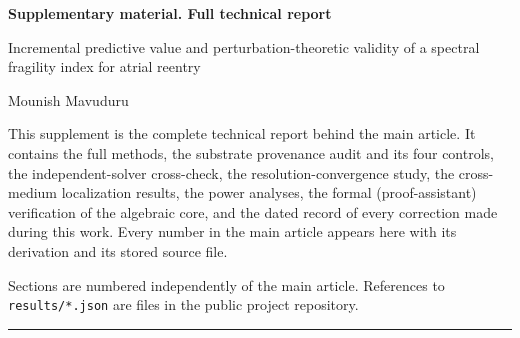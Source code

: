 \documentclass[11pt]{article}
\theoremstyle{definition}
\newcommand{\code}[1]{\texttt{#1}}
\begin{document}
\thispagestyle{empty}

\begin{center}
{\Large\bfseries Supplementary material. Full technical report\par}
\vspace{6pt}
{\large Incremental predictive value and perturbation-theoretic validity of a
spectral fragility index for atrial reentry\par}
\vspace{4pt}
Mounish Mavuduru
\end{center}

\vspace{1em}
\noindent This supplement is the complete technical report behind the main
article. It contains the full methods, the substrate provenance audit and
its four controls, the independent-solver cross-check, the resolution-convergence
study, the cross-medium localization results, the power analyses, the formal
(proof-assistant) verification of the algebraic core, and the dated record of
every correction made during this work. Every number in the main article appears
here with its derivation and its stored source file.

\noindent Sections are numbered independently of the main article. References to
\code{results/*.json} are files in the public project repository.

\vspace{1em}
\hrule
\vspace{1em}
\end{document}
